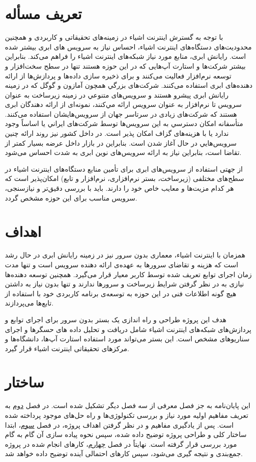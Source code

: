 \section{تعریف مسأله}

با توجه به گسترش اینترنت اشیاء در زمینه‌های تحقیقاتی و کاربردی و همچنین محدودیت‌های دستگاه‌های ‌‌اینترنت اشیاء، احساس نیاز به سرویس های ابری بیشتر شده است. رایانش ابری، منابع مورد نیاز شبکه‌های اینترنت اشیاء را فراهم می‌کند. بنابراین بیشتر شرکت‌ها و استارت آپ‌هایی که در این حوزه هستند تنها در سطح سخت‌افزار و توسعه نرم‌افزار فعالیت می‌کنند و برای ذخیره سازی داده‌ها و پردازش‌ها از ارائه دهنده‌های ابری استفاده می‌کنند. شركت‌های بزرگي همچون آمازون و گوگل كه در زمينه رایانش ابری پيشرو هستند و سرويس‌های متنوعي در زمينه زیرساخت به عنوان سرویس تا نرم‌افزار به عنوان سرویس ارائه مي‌كنند، نمونه‌ای از ارائه دهندگان ابری هستند که شرکت‌های زیادی در سرتاسر جهان از سرویس‌هایشان استفاده می‌کنند. متأسفانه امكان دسترسي به اين سرويس‌ها توسط شرکت‌های ايراني يا اساساً وجود ندارد يا با هزينه‌های گزاف امكان پذير است. در داخل كشور نيز روند ارائه چنين سرويس‌هايي در حال آغاز شدن است. بنابراين در بازار داخل عرضه بسيار كمتر از تقاضا است، بنابراين نياز به ارائه سرويس‌های نوین ابری به شدت احساس می‌شود.

از جهتی استفاده از سرویس‌های ابری برای تأمین منابع دستگاه‌های اینترنت اشیاء در سطح‌های مختلفی (زیرساخت، بستر نرم‌افزاری، نرم‌افزار و تابع) امکان‌پذیر است که هر کدام مزیت‌‌ها و معایب خاص خود را دارند. باید با بررسی دقیق‌تر و نیازسنجی، سرویس مناسب برای این حوزه مشخص گردد.

\section{اهداف}

همزمان با اینترنت اشیاء، معماری بدون سرور نیز در زمینه رایانش ابری در حال رشد است که هزینه و تقاضای سرورها به عهده‌ی ارائه دهنده سرویس است و تنها مدت زمان اجرای توابع تعریف شده توسط کاربر معیار قرار می‌گیرد. همچنین توسعه دهنده‌ها نیازی به در نظر گرفتن شرايط زيرساخت و سرورها ندارند و تنها بدون نیاز به داشتن هیچ گونه اطلاعات فنی در این حوزه‌ به توسعه‌ی برنامه کاربردی خود با استفاده از تابع‌ها می‌پردازند.

هدف این پروژه طراحی و راه اندازی یک بستر بدون سرور برای اجرای توابع و پردازش‌های شبکه‌های اینترنت اشیاء شامل دریافت و تحلیل داده های حسگرها و اجرای سناریوهای مشخص است. این بستر می‌تواند مورد استفاده استارت آپ‌ها، دانشگاه‌ها و مرکزهای تحقیقاتی اینترنت اشیاء قرار گیرد.

\section{ساختار}

این پایان‌نامه به جز فصل معرفی از سه فصل دیگر تشکیل شده است. در فصل \hyperref[chapter2]{دوم} به تعریف مفاهیم اولیه مورد نیاز و بررسی تکنولوژی‌ها و راه حل‌های موجود ‌پرداخته شده است. پس از یادگیری مفاهیم و در نظر گرفتن اهداف پروژه، در فصل \hyperref[chapter3]{سوم}، ابتدا ساختار کلی و طراحی پروژه توضیح داده شده، سپس نحوه پیاده سازی آن گام به گام مورد بررسی قرار گرفته است. نهایتاً در فصل \hyperref[chapter4]{چهارم}، کار‌های انجام شده در پروژه جمع‌بندی و نتیجه گیری می‌شود، سپس کارهای احتمالی آینده توضیح داده خواهد شد.

